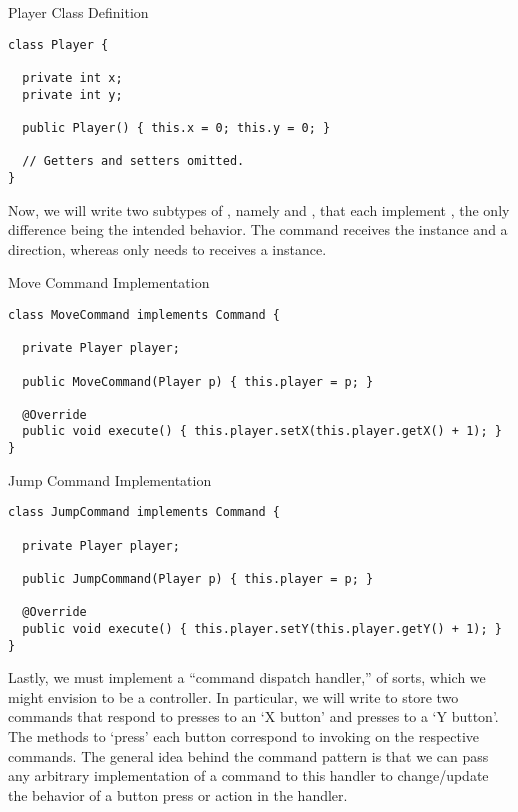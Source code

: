 \begin{cl}{Player Class Definition}
\begin{lstlisting}[language=MyJava]
class Player {
  
  private int x;
  private int y;

  public Player() { this.x = 0; this.y = 0; }

  // Getters and setters omitted.
}
\end{lstlisting}
\end{cl}

Now, we will write two subtypes of , namely  and , that each implement , the only difference being the intended behavior. The  command receives the  instance and a direction, whereas  only needs to receives a  instance. 

\begin{cl}{Move Command Implementation}
\begin{lstlisting}[language=MyJava]
class MoveCommand implements Command {

  private Player player;

  public MoveCommand(Player p) { this.player = p; }

  @Override
  public void execute() { this.player.setX(this.player.getX() + 1); }
}
\end{lstlisting}
\end{cl}

\begin{cl}{Jump Command Implementation}
\begin{lstlisting}[language=MyJava]
class JumpCommand implements Command {
  
  private Player player;

  public JumpCommand(Player p) { this.player = p; }

  @Override
  public void execute() { this.player.setY(this.player.getY() + 1); }
}
\end{lstlisting}
\end{cl}

Lastly, we must implement a ``command dispatch handler,'' of sorts, which we might envision to be a controller. In particular, we will write  to store two commands that respond to presses to an `X button' and presses to a `Y button'. The methods to `press' each button correspond to invoking  on the respective commands. The general idea behind the command pattern is that we can pass any arbitrary implementation of a command to this handler to change/update the behavior of a button press or action in the handler. 

